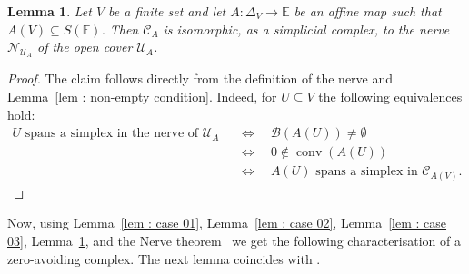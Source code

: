 \documentclass[a4paper,11pt,reqno, english]{amsart}
\newtheorem{lemma}[theorem]{Lemma}
\theoremstyle{definition}
\theoremstyle{remark}
\newcommand\NN{\mathscr N}
\newcommand\U{\mathscr U}
\newcommand\CC{\mathscr C}
\newcommand\E{\mathbb{E}}
\DeclareMathOperator{\conv}{\mathrm{conv}}
\begin{document}
\medskip
\begin{lemma}
	\label{lem : nerve}
	Let $V$ be a finite set and let $A\colon \Delta_V\longrightarrow\E$ be an affine map such that $A(V)\subseteq S(\E)$.
	Then  $\CC_{A}$ is isomorphic, as a simplicial complex, to the nerve $\NN_{\U_A}$ of the open cover $\U_A$.
\end{lemma}
\begin{proof}
	The claim follows directly from the definition of the nerve and Lemma~\ref{lem : non-empty condition}.
	Indeed, for $U\subseteq V$ the following equivalences hold:
	\begin{align*}
		U\text{ spans a simplex in the nerve of }\U_A \quad & \Longleftrightarrow	\quad \mathscr{B}( A(U))\neq \emptyset            \\
		                                                    & \Longleftrightarrow	\quad 0\notin\conv(A(U))                          \\
		                                                    & \Longleftrightarrow	\quad A(U) \text{ spans a simplex in }\CC_{A(V)}.
	\end{align*}
\end{proof}

\medskip
Now, using  Lemma~\ref{lem :  case 01}, Lemma~\ref{lem :  case 02}, Lemma~\ref{lem :  case 03}, Lemma~\ref{lem : nerve}, and the Nerve theorem~\cite[Cor.\,4G.3]{Hatcher2002} we get the following characterisation of a zero-avoiding complex.
The next lemma coincides with \cite[Thm.\,3.4]{Bludov2025}.
\end{document}
